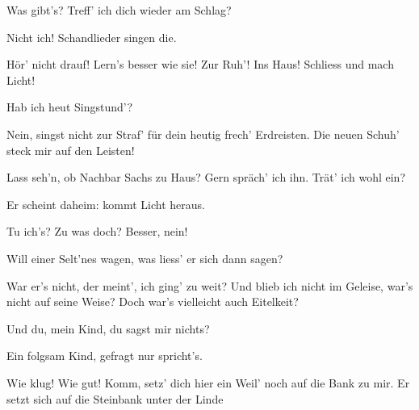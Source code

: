 \begin{drama}
\Sachsspeaks


Was gibt's? Treff' ich dich wieder am Schlag?

\Davidspeaks
Nicht ich! Schandlieder singen die.

\Sachsspeaks
Hör' nicht drauf! Lern's besser wie sie!
Zur Ruh'! Ins Haus! Schliess und mach Licht!




\Davidspeaks
Hab ich heut Singstund'?

\Sachsspeaks
Nein, singst nicht
zur Straf' für dein heutig frech' Erdreisten.
Die neuen Schuh' steck mir auf den Leisten!





\scene


\Pognerspeaks


Lass seh'n, ob Nachbar Sachs zu Haus?
Gern spräch' ich ihn. Trät' ich wohl ein?




\Evaspeaks


Er scheint daheim:
kommt Licht heraus.

\Pognerspeaks
Tu ich's? Zu was doch? Besser, nein!


Will einer Selt'nes wagen,
was liess' er sich dann sagen?


War er's nicht, der meint', ich ging' zu weit?
Und blieb ich nicht im Geleise,
war's nicht auf seine Weise?
Doch war's vielleicht auch Eitelkeit?


Und du, mein Kind, du sagst mir nichts?

\Evaspeaks
Ein folgsam Kind, gefragt nur spricht's.

\Pognerspeaks
Wie klug! Wie gut! Komm, setz' dich hier
ein Weil' noch auf die Bank zu mir.
Er setzt sich auf die Steinbank unter der Linde


\end{drama}
